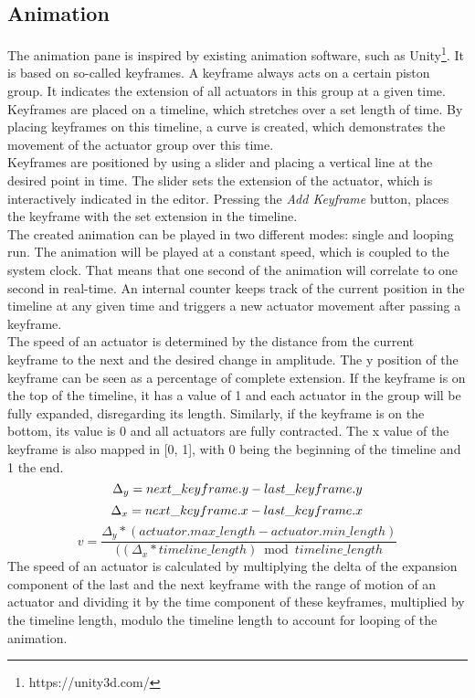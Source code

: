 \subsection{Animation}
The animation pane is inspired by existing animation software, such as Unity\footnote{https://unity3d.com/}. It is based on so-called keyframes. A keyframe always acts on a certain piston group. It indicates the extension of all actuators in this group at a given time. Keyframes are placed on a timeline, which stretches over a set length of time. By placing keyframes on this timeline, a curve is created, which demonstrates the movement of the actuator group over this time.\\
Keyframes are positioned by using a slider and placing a vertical line at the desired point in time. The slider sets the extension of the actuator, which is interactively indicated in the editor. Pressing the \textit{Add Keyframe} button, places the keyframe with the set extension in the timeline.\\
The created animation can be played in two different modes: single and looping run. The animation will be played at a constant speed, which is coupled to the system clock. That means that one second of the animation will correlate to one second in real-time. An internal counter keeps track of the current position in the timeline at any given time and triggers a new actuator movement after passing a keyframe.\\
The speed of an actuator is determined by the distance from the current keyframe to the next and the desired change in amplitude. The y position of the keyframe can be seen as a percentage of complete extension. If the keyframe is on the top of the timeline, it has a value of 1 and each actuator in the group will be fully expanded, disregarding its length. Similarly, if the keyframe is on the bottom, its value is 0 and all actuators are fully contracted. The x value of the keyframe is also mapped in [0, 1], with 0 being the beginning of the timeline and 1 the end.
\begin{equation}
  \Delta_y = next\_keyframe.y - last\_keyframe.y\\
\end{equation}
\begin{equation}
  \Delta_x = next\_keyframe.x - last\_keyframe.x\\
\end{equation}
\begin{equation}
  v = \frac{\Delta_y * (actuator.max\_length - actuator.min\_length)}{((\Delta_x * timeline\_length) \bmod timeline\_length}
\end{equation}
The speed of an actuator is calculated by multiplying the delta of the expansion component of the last and the next keyframe with the range of motion of an actuator and dividing it by the time component of these keyframes, multiplied by the timeline length, modulo the timeline length to account for looping of the animation.

